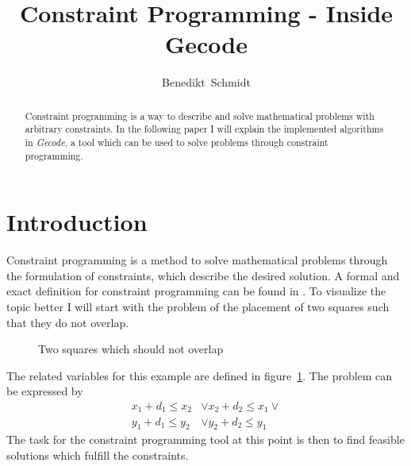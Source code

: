 \documentclass[10pt,
               a4paper,
               journal,
               ]{IEEEtran}
\makeatletter
\def\markboth#1#2{\def\leftmark{\@IEEEcompsoconly{\sffamily}\MakeUppercase{\protect#1}}%
\def\rightmark{\@IEEEcompsoconly{\sffamily}\MakeUppercase{\protect#2}}}
\newcommand{\reffig}[1]{{figure~\ref{#1}}}
\makeatother
\begin{document}
	\title{Constraint Programming - Inside Gecode}
	\author{Benedikt~Schmidt}
	\markboth{Advanced Seminar for Security in Information Technology, Summer Term 2014}%
	{Benedikt Schmidt: Constraint Programming - Inside \emph{Gecode}}	
	\maketitle	
	
	\begin{abstract}	
		Constraint programming is a way to describe and solve mathematical problems with arbitrary constraints. In the following paper I will explain the implemented algorithms in \emph{Gecode}, a tool which can be used to solve problems through constraint programming.
	\end{abstract}
	
	\section{Introduction}
	Constraint programming is a method to solve mathematical problems through the formulation of constraints, which describe the desired solution. A formal and exact definition for constraint programming can be found in \cite[p.~16]{handbookCP}. To visualize the topic better I will start with the problem of the placement of two squares such that they do not overlap.	
	
	\begin{figure}
		\center
		\caption{Two squares which should not overlap}
		\label{fig:squares}
	\end{figure}
	
	The related variables for this example are defined in \reffig{fig:squares}. The problem can be expressed by \cite[p. 101]{programmingGecode}
	\begin{equation}
	\begin{split}
		x_1 + d_1 \le x_2 & \lor x_2 + d_2 \le x_1 \lor \\
		y_1 + d_1 \le y_2 & \lor y_2 + d_2 \le y_1
	\end{split}
	\label{eq:squares}
	\end{equation}
	The task for the constraint programming tool at this point is then to find feasible solutions which fulfill the constraints.
	
\end{document}
